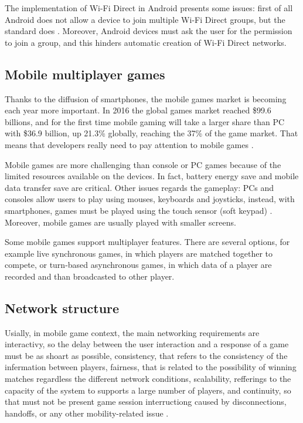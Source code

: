 The implementation of Wi-Fi Direct in Android presents some issues: first of all
Android does not allow a device to join multiple Wi-Fi Direct groups,
but the standard does \cite{bib:android-wifidirect-limits}. Moreover, Android 
devices must ask the user for the permission to join a group, and this hinders 
automatic creation of Wi-Fi Direct networks.

\subsection{Mobile multiplayer games}
Thanks to the diffusion of smartphones, the mobile games market is becoming each 
year more important. In 2016 the global games market reached \$99.6 billions, and 
for the first time mobile gaming will take a larger share than PC with \$36.9 billion, 
up 21.3\% globally, reaching the 37\% of the game market. That means that developers 
really need to pay attention to mobile games \cite{bib:newzoo2}.

Mobile games are more challenging than console or PC games because of the limited 
resources available on the devices. In fact, battery energy save and mobile data 
transfer save are critical. Other issues regards the gameplay: PCs and consoles 
allow users to play using mouses, keyboards and joysticks, instead, with smartphones, 
games must be played using the touch sensor (soft keypad) \cite{bib:mobile-input-devices}. 
Moreover, mobile games are usually played with smaller screens.

Some mobile games support multiplayer features. There are several options, for 
example live synchronous games, in which players are matched together to compete, 
or turn-based asynchronous games, in which data of a player are recorded and than 
broadcasted to other player.

\subsection{Network structure}
Usially, in mobile game context, the main networking requirements are interactivy, so 
the delay between the user interaction and a response of a game must be as shoart as possible, 
consistency, that refers to the consistency of the infermation between players, fairness, 
that is related to the possibility of winning matches regardless the different network conditions, 
scalability, refferings to the capacity of the system to supports a large number of players, 
and continuity, so that must not be present game session interructiong caused by disconnections, 
handoffs, or any other mobility-related issue \cite{bib:interactive-mobile-gaming}.

